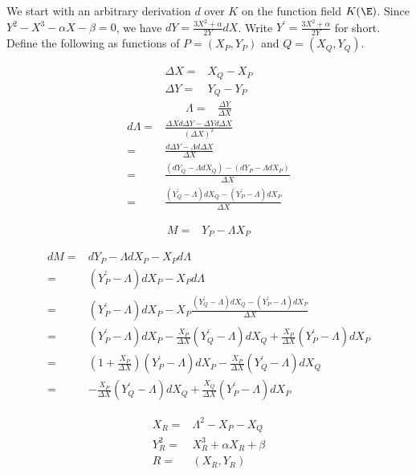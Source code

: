 \documentclass[11pt,letterpaper]{article}
\theoremstyle{definition}
\newcommand{\6}{\mathbf}
\newcommand{\7}{\mathcal}
\begin{document}
We start with an arbitrary derivation $d$ over $K$ on the function field $K(\E)$. Since $Y^2 - X^3 - \alpha X - \beta = 0$, we have $dY = \frac{3X^2+\alpha}{2Y}dX$. Write $Y^\prime = \frac{3X^2+\alpha}{2Y}$ for short. Define the following as functions of $P=(X_P, Y_P)$ and $Q=(X_Q,Y_Q)$.

\begin{align}
\Delta X =& X_Q - X_P \label{deltaX}\\
\Delta Y =& Y_Q - Y_P \label{deltaY}
\end{align}
\begin{align}
\Lambda =& \frac{\Delta Y}{\Delta X} \label{BigLambda} 
\end{align}
\begin{align}
d\Lambda =& \frac{\Delta X d \Delta Y - \Delta Y d \Delta X}{(\Delta X)^2}\\
=& \frac{d\Delta Y - \Lambda d \Delta X}{\Delta X} \\
 =& \frac{(dY_Q - \Lambda dX_Q) - (dY_P - \Lambda dX_P)}{\Delta X}\\
=& \frac{\left(Y^\prime_Q - \Lambda\right)dX_Q - \left(Y^\prime_P - \Lambda\right)dX_P}{\Delta X} \label{dBigLambda}
\end{align}

\begin{align}
M =& Y_P - \Lambda X_P \label{bigM}
\end{align}

\begin{align}
dM =& dY_P - \Lambda dX_P - X_P d\Lambda\\
=& \left(Y_P^\prime - \Lambda\right) dX_P - X_P d\Lambda\\
=& \left(Y_P^\prime - \Lambda\right) dX_P - X_P\frac{\left(Y_Q^\prime - \Lambda\right)dX_Q - \left(Y_P^\prime - \Lambda\right)dX_P}{\Delta X} \\
=& \left(Y_P^\prime - \Lambda\right) dX_P - \frac{X_P}{\Delta X} \left(Y_Q^\prime - \Lambda\right)dX_Q + \frac{X_P}{\Delta X}\left(Y_P^\prime - \Lambda\right)dX_P\\
=& \left(1+\frac{X_P}{\Delta X}\right)\left(Y_P^\prime - \Lambda\right) dX_P - \frac{X_P}{\Delta X} \left(Y_Q^\prime - \Lambda\right)dX_Q\\
=& - \frac{X_P}{\Delta X} \left(Y_Q^\prime - \Lambda\right)dX_Q + \frac{X_Q}{\Delta X}\left(Y_P^\prime - \Lambda\right) dX_P \label{dBigM}
\end{align}

\begin{align}
X_R =& \Lambda^2 - X_P - X_Q \label{xr}\\
Y_R^2 =& X_R^3 + \alpha X_R + \beta \label{yr2}\\
R =& (X_R, Y_R) \label{r}
\end{align}
\end{document}
